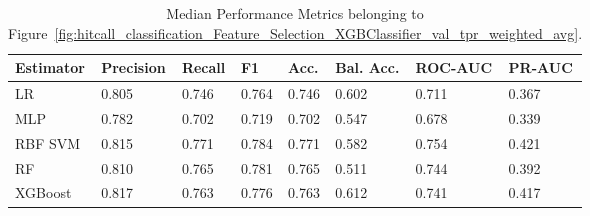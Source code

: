 \begin{longtable}{llllllll}
\caption{Median Performance Metrics belonging to Figure~\ref{fig:hitcall_classification_Feature_Selection_XGBClassifier_val_tpr_weighted_avg}.}\label{tab:table:hitcall_classification_feature_selection_xgbclassifier_val_tpr_weighted_avg}\\
\toprule
\midrule
\small Estimator & \small Precision & \small Recall & \small F1 & \small Acc. & \small Bal. Acc. & \small ROC-AUC & \small PR-AUC\\
\hline
LR & 0.805 & 0.746 & 0.764 & 0.746 & 0.602 & 0.711 & 0.367\\
MLP & 0.782 & 0.702 & 0.719 & 0.702 & 0.547 & 0.678 & 0.339\\
RBF SVM & 0.815 & 0.771 & 0.784 & 0.771 & 0.582 & 0.754 & 0.421\\
RF & 0.810 & 0.765 & 0.781 & 0.765 & 0.511 & 0.744 & 0.392\\
XGBoost & 0.817 & 0.763 & 0.776 & 0.763 & 0.612 & 0.741 & 0.417\\
\bottomrule
\end{longtable}